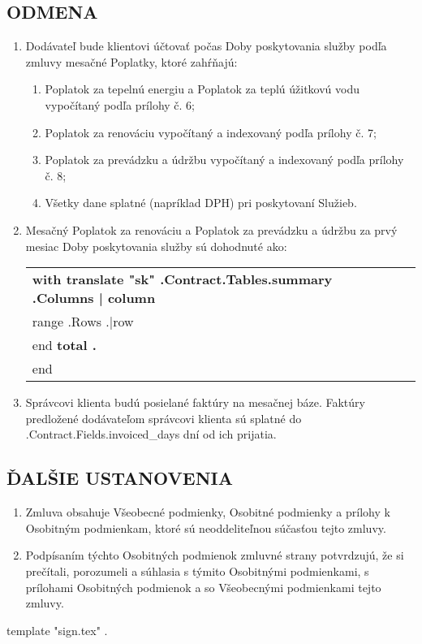 \subsection{ODMENA}
\begin{enumerate}
	\item	Dodávateľ bude klientovi účtovať počas Doby poskytovania služby podľa zmluvy mesačné Poplatky, ktoré zahŕňajú:
	\begin{enumerate}
		\item   Poplatok za tepelnú energiu a Poplatok za teplú úžitkovú vodu vypočítaný podľa prílohy č. 6; 
		\item	Poplatok za renováciu vypočítaný a indexovaný podľa prílohy č. 7;
		\item	Poplatok za prevádzku a údržbu vypočítaný a indexovaný podľa prílohy č. 8;
		\item	Všetky dane splatné (napríklad DPH) pri poskytovaní Služieb.
	\end{enumerate}
	\item	Mesačný Poplatok za renováciu a Poplatok za prevádzku a údržbu za prvý mesiac Doby poskytovania služby sú dohodnuté ako:
\begin{center}
	\begin{tabu}{|X|X|X|X|}\tabucline{}\rowfont[c]\bfseries
	{{with translate "sk" .Contract.Tables.summary}} %
	{{.Columns | column}} \\\tabucline{}
	{{range .Rows}} %
	{{.|row}} \\\tabucline{}
	{{end}}
	\bfseries {{total .}} \\\tabucline{} %
	{{end}}
	\end{tabu}
\end{center}

\item Správcovi klienta budú posielané faktúry na mesačnej báze. Faktúry predložené dodávateľom správcovi klienta sú splatné do \iffalse input fields.invoiced_days value="{{.Contract.Fields.invoiced_days}}" type="number" \fi {{.Contract.Fields.invoiced_days}}  dní od ich prijatia.
\end{enumerate}

\subsection{ĎALŠIE USTANOVENIA}
\begin{enumerate}
	\item Zmluva obsahuje Všeobecné podmienky, Osobitné podmienky a prílohy k Osobitným podmienkam, ktoré sú neoddeliteľnou súčasťou tejto zmluvy.
	\item Podpísaním týchto Osobitných podmienok zmluvné strany potvrdzujú, že si prečítali, porozumeli a súhlasia s týmito Osobitnými podmienkami, s prílohami Osobitných podmienok a so Všeobecnými podmienkami tejto zmluvy.
\end{enumerate}
{{template "sign.tex" .}} %


